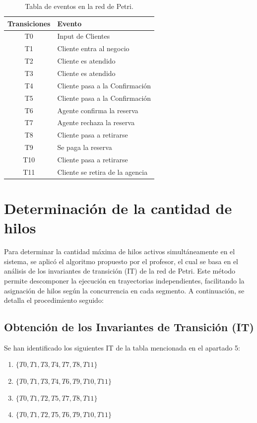 \documentclass[12pt]{article}
\begin{document}
\begin{table}[H]
    \centering
    \renewcommand{\arraystretch}{1.2}
    \begin{tabularx}{\textwidth}{|c|X|}
    \hline
    \rowcolor{green!20}
    \textbf{Transiciones} & \textbf{Evento} \\ \hline
    T0  & Input de Clientes                \\ \hline
    T1  & Cliente entra al negocio         \\ \hline
    T2  & Cliente es atendido              \\ \hline
    T3  & Cliente es atendido              \\ \hline
    T4  & Cliente pasa a la Confirmación   \\ \hline
    T5  & Cliente pasa a la Confirmación   \\ \hline
    T6  & Agente confirma la reserva       \\ \hline
    T7  & Agente rechaza la reserva        \\ \hline
    T8  & Cliente pasa a retirarse         \\ \hline
    T9  & Se paga la reserva               \\ \hline
    T10 & Cliente pasa a retirarse         \\ \hline
    T11 & Cliente se retira de la agencia  \\ \hline
    \end{tabularx}
    \caption{Tabla de eventos en la red de Petri.}
    \label{tabla:eventos-red-petri}
\end{table}


\section{Determinación de la cantidad de hilos}

Para determinar la cantidad máxima de hilos activos simultáneamente en el sistema, se aplicó el algoritmo propuesto por el profesor, el cual se basa en el análisis de los invariantes de transición (IT) de la red de Petri. Este método permite descomponer la ejecución en trayectorias independientes, facilitando la asignación de hilos según la concurrencia en cada segmento. A continuación, se detalla el procedimiento seguido:

\subsection{Obtención de los Invariantes de Transición (IT)}
Se han identificado los siguientes IT de la tabla mencionada en el apartado 5:
\begin{enumerate}
    \item $\{T0, T1, T3, T4, T7, T8, T11\}$
    \item $\{T0, T1, T3, T4, T6, T9, T10, T11\}$
    \item $\{T0, T1, T2, T5, T7, T8, T11\}$
    \item $\{T0, T1, T2, T5, T6, T9, T10, T11\}$
\end{enumerate}
\newpage
\end{document}
